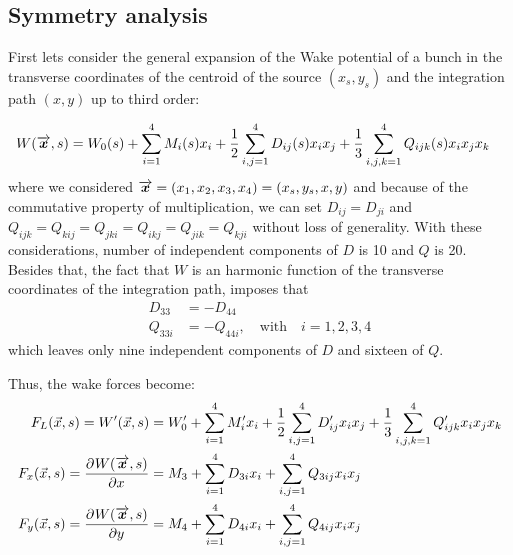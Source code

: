 \begin{apendicesenv}
\chapter{Symmetry analysis}\label{app:symmetry_analysis}

    First lets consider the general expansion of the Wake potential of a bunch in the transverse coordinates of the centroid of the source $(x_s,y_s)$ and the integration path $(x,y)$ up to third order:

    \begin{align}
		W(\overrightarrow{\boldsymbol{x}},s) &= W_0(s) + \sum_{i=1}^4 M_i(s) x_i + \frac12\sum_{i,j=1}^4 D_{ij}(s) x_i x_j + \frac13\sum_{i,j,k=1}^4 Q_{ijk}(s) x_i x_j x_k
    \end{align}
    where we considered $\overrightarrow{\boldsymbol{x}} = (x_1,x_2,x_3,x_4) = (x_s,y_s,x,y)$ and because of the commutative property of multiplication, we can set $D_{ij} = D_{ji}$ and $Q_{ijk}=Q_{kij}=Q_{jki}=Q_{ikj}=Q_{jik}=Q_{kji}$ without loss of generality. With these considerations, number of independent components of $D$ is 10 and $Q$ is 20. Besides that, the fact that $W$ is an harmonic function of the transverse coordinates of the integration path, imposes that
    \begin{align}
		D_{33} &= - D_{44} \\
		Q_{33i} &= - Q_{44i}, \quad \text{with} \quad i=1,2,3,4
    \end{align}
    which leaves only nine independent components of $D$ and sixteen of $Q$.

    Thus, the wake forces become:
    \begin{align}
		F_L(\vec{x},s) = W'(\vec{x},s) &= W_0' + \sum_{i=1}^4 M_i' x_i + \frac12\sum_{i,j=1}^4 D_{ij}' x_i x_j + \frac13\sum_{i,j,k=1}^4 Q_{ijk}' x_i x_j x_k \\
		F_x(\vec{x},s) = \frac{\partial^{{}}W(\overrightarrow{\boldsymbol{x}},s)}{\partial x^{{}}} &= M_3 + \sum_{i=1}^4 D_{3i} x_i + \sum_{i,j=1}^4 Q_{3ij} x_i x_j \\
		F_y(\vec{x},s) = \frac{\partial^{{}}W(\overrightarrow{\boldsymbol{x}},s)}{\partial y^{{}}} &= M_4 + \sum_{i=1}^4 D_{4i} x_i + \sum_{i,j=1}^4 Q_{4ij} x_i x_j
    \end{align}


\end{apendicesenv}
